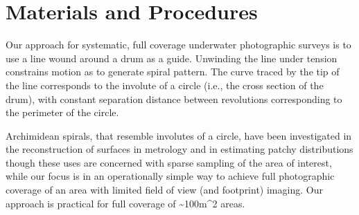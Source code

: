 \section{Materials and Procedures}

Our approach for systematic, full coverage underwater photographic surveys is to use a line wound around a drum as a guide. Unwinding the line under tension constrains motion as to generate spiral pattern. The curve traced by the tip of the line corresponds to the involute of a circle (i.e., the cross section of the drum), with constant separation distance between revolutions corresponding to the perimeter of the circle. 

Archimidean spirals, that resemble involutes of a circle, have been investigated in the reconstruction of surfaces in metrology \cite{Wieczorowski_2001} and in estimating patchy distributions \cite{Kalikhman_2006} though these uses are concerned with sparse sampling of the area of interest, while our focus is in an operationally simple way to achieve full photographic coverage of an area with limited field of view (and footprint) imaging. Our approach is practical for full coverage of \sim{100m^{2}} areas.

